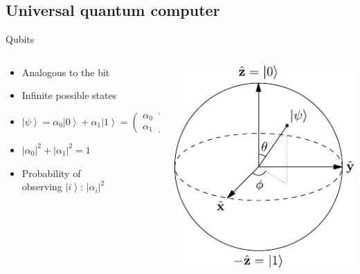\documentclass[14pt]{beamer}
\newcommand{\braket}[1]{\ensuremath{\left | #1 \right \rangle}}
\begin{document}
\subsection{Universal quantum computer}
\begin{frame}{Qubits}
\begin{columns}[T]
	\begin{column}{.6\textwidth}
		\begin{block}{}
			\begin{itemize}
				\item Analogous to the bit
				\item Infinite possible states
				\pause
				\item $ \left | \psi \right \rangle=\alpha _{0}\left | 0 \right \rangle+\alpha _{1}\left | 1 \right \rangle=\begin{pmatrix}\alpha_{0}\\ \alpha_{1}\end{pmatrix}$
				\pause
				\item $ \left | \alpha_{0} \right |^{2} + \left | \alpha_{1} \right |^{2}=1$
				\pause
				\item Probability of \\ observing $\braket{i}$: $|\alpha_i|^2$
			\end{itemize}
    	\end{block}
	\end{column}
	\begin{column}{.4\textwidth}
    	\begin{block}{}
			\includegraphics[width=1\textwidth]{../resources/pdfs/Bloch_Sphere.pdf}

\end{block}
\end{column}
\end{columns}
\end{frame}
\end{document}
